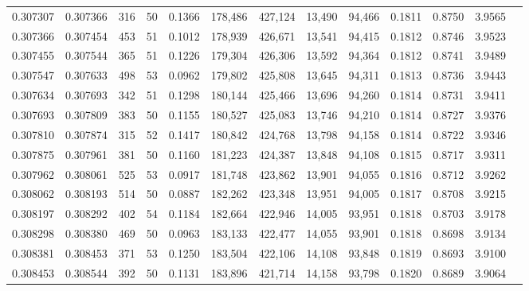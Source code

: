 \begin{tabular}{rrrrrrrrrrrrr}
0.307307 & 0.307366 &   316 &  50 &                                     0.1366 & 178,486 & 427,124 &  13,490 &  94,466 & 0.1811 & 0.8750 & 3.9565 \\
0.307366 & 0.307454 &   453 &  51 &                                     0.1012 & 178,939 & 426,671 &  13,541 &  94,415 & 0.1812 & 0.8746 & 3.9523 \\
0.307455 & 0.307544 &   365 &  51 &                                     0.1226 & 179,304 & 426,306 &  13,592 &  94,364 & 0.1812 & 0.8741 & 3.9489 \\
0.307547 & 0.307633 &   498 &  53 &                                     0.0962 & 179,802 & 425,808 &  13,645 &  94,311 & 0.1813 & 0.8736 & 3.9443 \\
0.307634 & 0.307693 &   342 &  51 &                                     0.1298 & 180,144 & 425,466 &  13,696 &  94,260 & 0.1814 & 0.8731 & 3.9411 \\
0.307693 & 0.307809 &   383 &  50 &                                     0.1155 & 180,527 & 425,083 &  13,746 &  94,210 & 0.1814 & 0.8727 & 3.9376 \\
0.307810 & 0.307874 &   315 &  52 &                                     0.1417 & 180,842 & 424,768 &  13,798 &  94,158 & 0.1814 & 0.8722 & 3.9346 \\
0.307875 & 0.307961 &   381 &  50 &                                     0.1160 & 181,223 & 424,387 &  13,848 &  94,108 & 0.1815 & 0.8717 & 3.9311 \\
0.307962 & 0.308061 &   525 &  53 &                                     0.0917 & 181,748 & 423,862 &  13,901 &  94,055 & 0.1816 & 0.8712 & 3.9262 \\
0.308062 & 0.308193 &   514 &  50 &                                     0.0887 & 182,262 & 423,348 &  13,951 &  94,005 & 0.1817 & 0.8708 & 3.9215 \\
0.308197 & 0.308292 &   402 &  54 &                                     0.1184 & 182,664 & 422,946 &  14,005 &  93,951 & 0.1818 & 0.8703 & 3.9178 \\
0.308298 & 0.308380 &   469 &  50 &                                     0.0963 & 183,133 & 422,477 &  14,055 &  93,901 & 0.1818 & 0.8698 & 3.9134 \\
0.308381 & 0.308453 &   371 &  53 &                                     0.1250 & 183,504 & 422,106 &  14,108 &  93,848 & 0.1819 & 0.8693 & 3.9100 \\
0.308453 & 0.308544 &   392 &  50 &                                     0.1131 & 183,896 & 421,714 &  14,158 &  93,798 & 0.1820 & 0.8689 & 3.9064 \\

\end{tabular}
